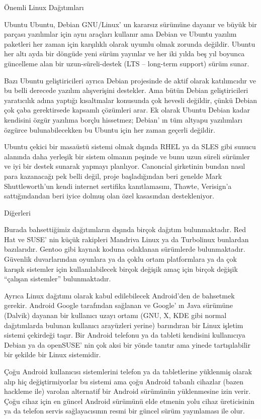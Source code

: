 \begin{section}{Önemli Linux Dağıtımları}
\begin{subsection}{Ubuntu}
Ubuntu, Debian GNU/Linux' un kararsız sürümüne dayanır ve büyük bir parçası yazılımlar için aynı araçları kullanır ama Debian ve Ubuntu yazılım paketleri her zaman için karşılıklı olarak uyumlu olmak zorunda değildir. Ubuntu her altı ayda bir döngüde yeni sürüm yayınlar ve her iki yılda beş yıl boyunca güncelleme alan bir uzun-süreli-destek (LTS – long-term support) sürüm sunar.

Bazı Ubuntu geliştiricileri ayrıca Debian projesinde de aktif olarak katılımcıdır ve bu belli derecede yazılım alışverişini destekler. Ama bütün Debian geliştiricileri yaratıcılık adına yaptığı kısaltmalar konusunda çok hevesli değildir, çünkü Debian çok çaba gerektirsede kapsamlı çözümleri arar. Ek olarak Ubuntu Debian kadar kendisini özgür yazılıma borçlu hissetmez; Debian' ın tüm altyapu yazılımları özgürce bulunabilecekken bu Ubuntu için her zaman geçerli değildir.

Ubuntu çekici bir masaüstü sistemi olmak dışında RHEL ya da SLES gibi sunucu alanında daha yerleşik bir sistem olmanın peşinde ve bunu uzun süreli sürümler ve iyi bir destek sunarak yapmayı planlıyor. Canoncial şirketinin bundan nasıl para kazanacağı pek belli değil, proje başladığından beri genelde Mark Shuttleworth'un kendi internet sertifika kanıtlamasını, Thawte, Verisign'a sattığındandan beri iyice dolmuş olan özel kasasından destekleniyor.

\end{subsection}
\begin{subsection}{Diğerleri}

Burada bahsettiğimiz dağıtımların dışında birçok dağıtım bulunmaktadır. Red Hat ve SUSE' nin küçük rakipleri Mandriva Linux ya da Turbolinux bunlardan bazılarıdır. Gentoo gibi kaynak koduna odaklanan sürümlerde bulunmaktadır. Güvenlik duvarlarından oyunlara ya da çoklu ortam platformlara ya da çok karışık sistemler için kullanılabilecek birçok değişik amaç için birçok değişik “çalışan sistemler” bulunmaktadır.

Ayrıca Linux dağıtımı olarak kabul edilebilecek Android'den de bahsetmek gerekir. Android Google tarafından sağlanan ve Google' ın Java sürümüne (Dalvik) dayanan bir kullanıcı uzayı ortamı (GNU, X, KDE gibi normal dağıtımlarda bulunan kullanıcı arayüzleri yerine) barındıran bir Linux işletim sistemi çekirdeği taşır. Bir Android telefonu ya da tableti kendisini kullanıcıya Debian ya da openSUSE' nin çok aksi bir yönde tanıtır ama yinede tartışılabilir bir şekilde bir Linux sistemidir.

Çoğu Android kullanıcısı sistemlerini telefon ya da tabletlerine yüklenmiş olarak alıp hiç değiştirmiyorlar bu sistemi ama çoğu Android tabanlı cihazlar (bazen hackleme ile) varolan alternatif bir Android sürümünün yüklenmesine izin verir. Çoğu cihaz için en güncel Android sürümünü elde etmenin yolu cihaz üreticisinin ya da telefon servis sağlayacısının resmi bir güncel sürüm yayınlaması ile olur.


\end{subsection}
\end{section}
